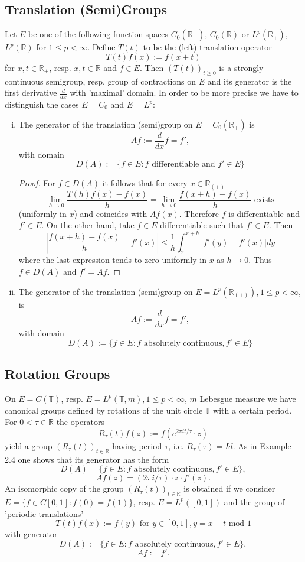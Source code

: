 \subsection{Translation (Semi)Groups}
Let $E$ be one of the following function spaces $C_0(\mathbb{R}_+)$, $C_0(\mathbb{R})$ or $L^p(\mathbb{R}_+)$, $L^p(\mathbb{R})$ for $1 \leq p < \infty$.
Define $T(t)$ to be the (left) translation operator
\[
T(t)f(x) := f(x+t)
\]
for $x,t \in \mathbb{R}_+$, resp. $x,t \in \mathbb{R}$ and $f \in E$.
Then $(T(t))_{t \geq 0}$ is a strongly continuous semigroup, resp. group of contractions on $E$ and its generator is the first derivative $\frac{d}{dx}$ with 'maximal' domain.
In order to be more precise we have to distinguish the cases $E=C_0$ and $E=L^p$:

\begin{enumerate}[(i)]

\item
The generator of the translation (semi)group on $E=C_0(\mathbb{R}_+)$ is
\[
Af := \frac{d}{dx}f = f',
\]
with domain 
\[
D(A) := \{f \in E \colon f \text{ differentiable and } f' \in E\}
\]
\begin{proof} For $f \in D(A)$ it follows that for every $x \in \mathbb{R}_{(+)}$
\[
\lim_{h \to 0} \frac{T(h)f(x)-f(x)}{h} = \lim_{h \to 0} \frac{f(x+h)-f(x)}{h} \text{ exists}
\]
(uniformly in $x$) and coincides with $Af(x)$.
Therefore $f$ is differentiable and $f' \in E$.
On the other hand, take $f \in E$ differentiable such that $f' \in E$.
Then
\[
\left|\frac{f(x+h)-f(x)}{h}-f'(x)\right| \leq \frac{1}{h} \int_{x}^{x+h}|f'(y)-f'(x)| dy
\]
where the last expression tends to zero uniformly in $x$ as $h \to 0$.
Thus $f \in D(A)$ and $f' = Af$.
\end{proof}

\item 
The generator of the translation (semi)group on $E=L^p(\mathbb{R}_{(+)}), 1 \leq p < \infty$, is
\[
Af := \frac{d}{dx}f = f',
\]
with domain
\[
D(A) := \{f \in E \colon f \text{ absolutely continuous}, f' \in E\}
\]
\end{enumerate}
\subsection{Rotation Groups}
On $E=C(\mathbb{T})$, resp. $E=L^p(\mathbb{T},m), 1 \leq p < \infty$, $m$ Lebesgue measure we have canonical groups defined by rotations of the unit circle $\mathbb{T}$ with a certain period.
For $0 < \tau \in \mathbb{R}$ the operators
\[
R_\tau(t)f(z) := f(e^{2\pi it/\tau} \cdot z)
\]
yield a group $(R_\tau(t))_{t \in \mathbb{R}}$ having period $\tau$, i.e. $R_\tau(\tau)=Id$.
As in Example 2.4 one shows that its generator has the form
\[
D(A) = \{f \in E \colon f \text{ absolutely continuous}, f' \in E\},
\]
\[
Af(z) = (2\pi i/\tau) \cdot z \cdot f'(z).
\]
An isomorphic copy of the group $(R_\tau(t))_{t \in \mathbb{R}}$ is obtained if we consider $E=\{f \in C[0,1] \colon f(0)=f(1)\}$, resp. $E=L^p([0,1])$ and the group of 'periodic translations'
\[
T(t)f(x) := f(y) \text{ for } y \in [0,1], y = x+t \text{ mod } 1
\]
with generator
\[
D(A) := \{f \in E \colon f \text{ absolutely continuous}, f' \in E\},
\]
\[
Af := f'.
\]
